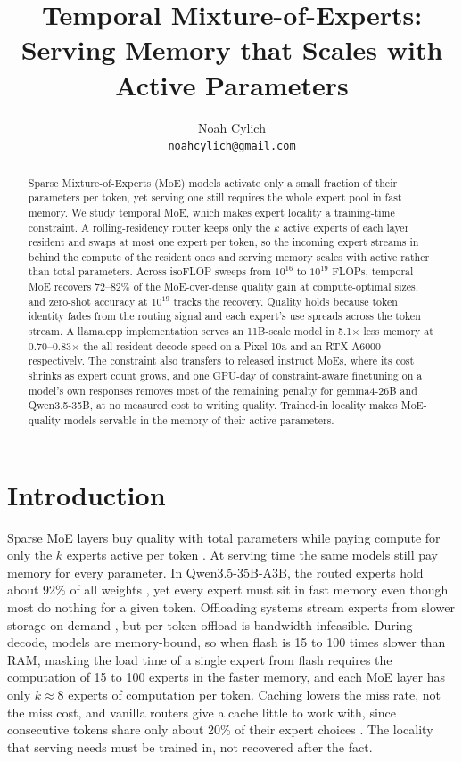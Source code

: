 \documentclass{article}
\title{Temporal Mixture-of-Experts:\\ Serving Memory that Scales with Active Parameters}
\author{Noah Cylich \\
\texttt{noahcylich@gmail.com}
}
\begin{document}
\maketitle

\begin{abstract}
Sparse Mixture-of-Experts (MoE) models activate only a small fraction of their parameters per
token, yet serving one still requires the whole expert pool in fast memory. We study temporal
MoE, which makes expert locality a training-time constraint. A rolling-residency router keeps
only the $k$ active experts of each layer resident and swaps at most one expert per token, so
the incoming expert streams in behind the compute of the resident ones and serving memory
scales with active rather than total parameters. Across isoFLOP sweeps from $10^{16}$ to
$10^{19}$ FLOPs, temporal MoE recovers 72--82\% of the MoE-over-dense quality gain at
compute-optimal sizes, and zero-shot accuracy at $10^{19}$ tracks the recovery. Quality holds
because token identity fades from the routing signal and each expert's use spreads across
the token stream. A
llama.cpp implementation serves an 11B-scale model in 5.1$\times$ less memory at
0.70--0.83$\times$ the all-resident decode speed on a Pixel 10a and an RTX A6000 respectively.
The constraint also transfers to released instruct MoEs, where its cost shrinks as expert
count grows, and one GPU-day of constraint-aware finetuning on a model's own responses removes
most of the remaining penalty for gemma4-26B and Qwen3.5-35B, at no measured cost to writing
quality. Trained-in locality makes MoE-quality models servable in the memory of their active
parameters.
\end{abstract}

\section{Introduction}\label{sec:intro}

Sparse MoE layers buy quality with total parameters while paying compute for only the $k$
experts active per token \citep{shazeer2017,dai2024deepseekmoe,jiang2024mixtral}. At serving
time the same models still pay memory for every parameter. In Qwen3.5-35B-A3B, the routed
experts hold about 92\% of all weights \citep{qwen35}, yet every expert must sit in fast
memory even though most do nothing for a given token. Offloading systems stream experts from
slower storage on demand \citep{eliseev2023,skliar2024}, but per-token offload is
bandwidth-infeasible. During decode, models are memory-bound, so when flash is 15 to 100
times slower than RAM, masking the load time of a single expert from flash requires the
computation of 15 to 100 experts in the faster memory, and each MoE layer has only
$k\approx8$ experts of computation per token. Caching lowers the miss rate, not the miss
cost, and vanilla routers give a cache little to work with, since consecutive tokens share
only about 20\% of their expert choices
\citep{jiang2024mixtral,muennighoff2024olmoe,liang2025local}. The locality that serving needs
must be trained in, not recovered after the fact.
\end{document}
